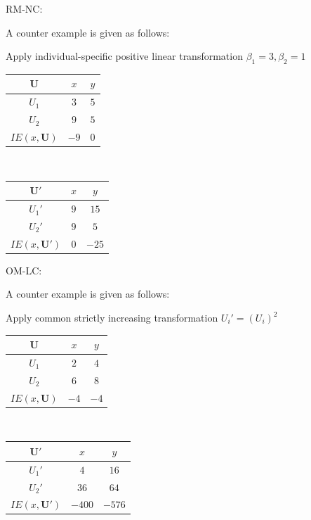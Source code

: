 \documentclass[a4paper]{article}
\begin{document}
RM-NC: 

A counter example is given as follows:

Apply individual-specific positive linear transformation $\beta_1=3, \beta_2=1$
\begin{table}[!htbp]
    \centering
    \begin{tabular}{c|cc|}
        $\mathbf{U}$ & $x$ & $y$              \\ 
        \hline
        $U_1$        & $3$ & $5$ \\
        $U_2$        & $9$ & $5$ \\
        \hline
        $IE(x,\mathbf{U})$ & $-9$ & $0$ \\
    \end{tabular}
    $\qquad\qquad$
    \begin{tabular}{c|cc|}
        $\mathbf{U'}$ & $x$ & $y$              \\ 
        \hline
        $U_1'$        & $9$ & $15$ \\
        $U_2'$        & $9$ & $5$ \\
        \hline
        $IE(x,\mathbf{U}')$ & $0$ & $-25$ \\
    \end{tabular}
\end{table}

OM-LC:

A counter example is given as follows:

Apply common strictly increasing transformation $U_i'=(U_i)^2$
\begin{table}[!htbp]
    \centering
    \begin{tabular}{c|cc|}
        $\mathbf{U}$ & $x$ & $y$              \\ 
        \hline
        $U_1$        & $2$ & $4$ \\
        $U_2$        & $6$ & $8$ \\
        \hline
        $IE(x,\mathbf{U})$ & $-4$ & $-4$ \\
    \end{tabular}
    $\qquad\qquad$
    \begin{tabular}{c|cc|}
        $\mathbf{U'}$ & $x$ & $y$              \\ 
        \hline
        $U_1'$        & $4$ & $16$ \\
        $U_2'$        & $36$ & $64$ \\
        \hline
        $IE(x,\mathbf{U}')$ & $-400$ & $-576$ \\
    \end{tabular}
\end{table}
\end{document}
